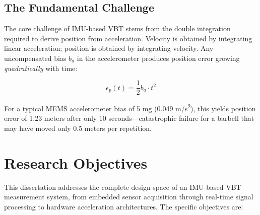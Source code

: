 \subsection{The Fundamental Challenge}

The core challenge of IMU-based VBT stems from the double integration required to derive position from acceleration. Velocity is obtained by integrating linear acceleration; position is obtained by integrating velocity. Any uncompensated bias $b_a$ in the accelerometer produces position error growing \textit{quadratically} with time:

\begin{equation}
    \epsilon_p(t) = \frac{1}{2} b_a \cdot t^2
\end{equation}

For a typical MEMS accelerometer bias of 5 mg (0.049 m/s\textsuperscript{2}), this yields position error of 1.23 meters after only 10 seconds---catastrophic failure for a barbell that may have moved only 0.5 meters per repetition.

\section{Research Objectives}

This dissertation addresses the complete design space of an IMU-based VBT measurement system, from embedded sensor acquisition through real-time signal processing to hardware acceleration architectures. The specific objectives are:

